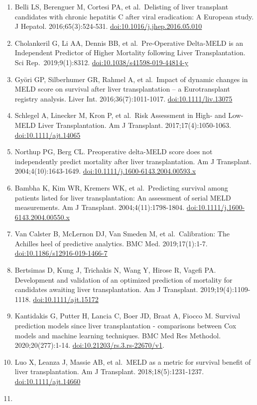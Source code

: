 \documentclass[11pt,english,]{book} %
\begin{document}
\begin{enumerate}
\item
  Belli LS, Berenguer M, Cortesi PA, et al.~Delisting of liver transplant candidates with chronic hepatitis C after viral eradication: A European study. J Hepatol. 2016;65(3):524-531. \url{doi:10.1016/j.jhep.2016.05.010}
\item
  Cholankeril G, Li AA, Dennis BB, et al.~Pre-Operative Delta-MELD is an Independent Predictor of Higher Mortality following Liver Transplantation. Sci Rep.~2019;9(1):8312. \url{doi:10.1038/s41598-019-44814-y}
\item
  Györi GP, Silberhumer GR, Rahmel A, et al.~Impact of dynamic changes in MELD score on survival after liver transplantation -- a Eurotransplant registry analysis. Liver Int. 2016;36(7):1011-1017. \url{doi:10.1111/liv.13075}
\item
  Schlegel A, Linecker M, Kron P, et al.~Risk Assessment in High- and Low-MELD Liver Transplantation. Am J Transplant. 2017;17(4):1050-1063. \url{doi:10.1111/ajt.14065}
\item
  Northup PG, Berg CL. Preoperative delta-MELD score does not independently predict mortality after liver transplantation. Am J Transplant. 2004;4(10):1643-1649. \url{doi:10.1111/j.1600-6143.2004.00593.x}
\item
  Bambha K, Kim WR, Kremers WK, et al.~Predicting survival among patients listed for liver transplantation: An assessment of serial MELD measurements. Am J Transplant. 2004;4(11):1798-1804. \url{doi:10.1111/j.1600-6143.2004.00550.x}
\item
  Van Calster B, McLernon DJ, Van Smeden M, et al.~Calibration: The Achilles heel of predictive analytics. BMC Med. 2019;17(1):1-7. \url{doi:10.1186/s12916-019-1466-7}
\item
  Bertsimas D, Kung J, Trichakis N, Wang Y, Hirose R, Vagefi PA. Development and validation of an optimized prediction of mortality for candidates awaiting liver transplantation. Am J Transplant. 2019;19(4):1109-1118. \url{doi:10.1111/ajt.15172}
\item
  Kantidakis G, Putter H, Lancia C, Boer JD, Braat A, Fiocco M. Survival prediction models since liver transplantation - comparisons between Cox models and machine learning techniques. BMC Med Res Methodol. 2020;20(277):1-14. \url{doi:10.21203/rs.3.rs-22670/v1}.
\item
  Luo X, Leanza J, Massie AB, et al.~MELD as a metric for survival benefit of liver transplantation. Am J Transplant. 2018;18(5):1231-1237. \url{doi:10.1111/ajt.14660}
\item

\end{enumerate}
\end{document}
